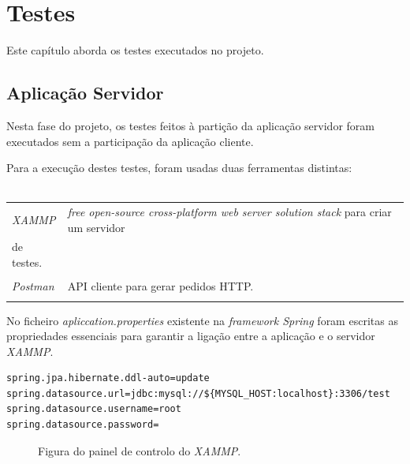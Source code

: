 %
%
%
\chapter{Testes} \label{testes}
Este capítulo aborda os testes executados no projeto.

\section{Aplicação Servidor} \label{sec51}
Nesta fase do projeto, os testes feitos à partição da aplicação servidor foram executados sem a participação da aplicação cliente.

Para a execução destes testes, foram usadas duas ferramentas distintas:\\
\\
\begin{tabular}{ll}
	\emph{XAMMP} & \emph{free open-source cross-platform web server solution stack} para criar um servidor\\
	 de testes.\\
	 \\
	\emph{Postman} & API cliente para gerar pedidos HTTP.\\
	\\
\end{tabular}

No ficheiro \emph{apliccation.properties} existente na \emph{framework Spring} foram escritas as propriedades essenciais para garantir a ligação entre a aplicação e o servidor \emph{XAMMP}.

\begin{verbatim}
spring.jpa.hibernate.ddl-auto=update
spring.datasource.url=jdbc:mysql://${MYSQL_HOST:localhost}:3306/test
spring.datasource.username=root
spring.datasource.password=
\end{verbatim}

\begin{figure}[h]
	\begin{center}
	\end{center}
	\caption{Figura do painel de controlo do \emph{XAMMP}.}\label{fig:logotipo}
\end{figure}


